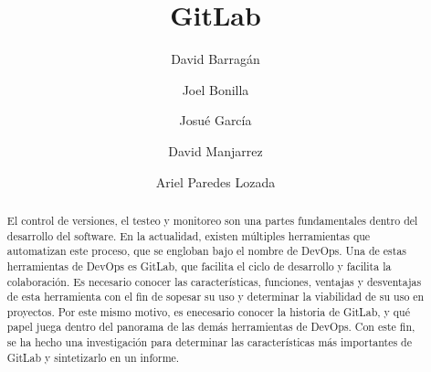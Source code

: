 \documentclass[runningheads]{llncs}
\begin{document}
\title{GitLab}
\author{David Barragán \and
        Joel Bonilla \and
        Josué García \and
        David Manjarrez \and
        Ariel Paredes Lozada
        }

\maketitle
\begin{abstract}
        El control de versiones, el testeo y monitoreo son una partes fundamentales dentro del desarrollo del software.
        En la actualidad, existen múltiples herramientas que automatizan este proceso, que se engloban bajo el nombre de DevOps.
        Una de estas herramientas de DevOps es GitLab, que facilita el ciclo de desarrollo y facilita la colaboración.
        Es necesario conocer las características, funciones, ventajas y desventajas de esta herramienta con el fin de 
        sopesar su uso y determinar la viabilidad de su uso en proyectos. Por este mismo motivo, es enecesario conocer la
        historia de GitLab, y qué papel juega dentro del panorama de las demás herramientas de DevOps.
        Con este fin, se ha hecho una investigación para determinar las características más importantes de GitLab y
        sintetizarlo en un informe. 
\end{abstract}
\end{document}

